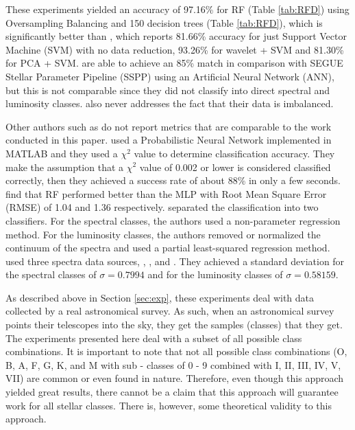 \documentclass[trackchanges, floatfix, twocolumn, tighten]{aastex62}
\begin{document}
These experiments yielded an accuracy of 97.16\% for RF (Table \ref{tab:RFD}) using Oversampling Balancing and 150 decision trees (Table \ref{tab:RFD}), which is significantly better than \cite{Xing}, which reports 81.66\% accuracy for just Support Vector Machine (SVM) with no data reduction, 93.26\% for wavelet + SVM and 81.30\% for PCA + SVM.  \cite{Schierscher} are able to achieve an 85\% match in comparison with SEGUE Stellar Parameter Pipeline (SSPP) using an Artificial Neural Network (ANN), but this is not comparable since they did not classify into direct spectral and luminosity classes. \cite{Schierscher} also never addresses the fact that their data is imbalanced.

Other authors such as \cite{Bazarghan, YI, Luo} do not report metrics that are comparable to the work conducted in this paper. \cite{Bazarghan} used a Probabilistic Neural Network implemented in MATLAB and they used a $\chi^2$ value to determine classification accuracy. They make the assumption that a $\chi^2$ value of 0.002 or lower is considered classified correctly, then they achieved a success rate of about 88\% in only a few seconds. \cite{YI} find that RF performed better than the MLP with Root Mean Square Error (RMSE) of 1.04 and 1.36 respectively. \cite{Luo} separated the classification into two classifiers. For the spectral classes, the authors used a non-parameter regression method. For the luminosity classes, the authors removed or normalized the continuum of the spectra and used a partial least-squared regression method. \cite{Luo} used three spectra data sources, \cite{Silva}, \cite{Pickles}, and \cite{Jacoby}. They achieved a standard deviation for the spectral classes of $\sigma = 0.7994$ and for the luminosity classes of $\sigma = 0.58159$.

As described above in Section \ref{sec:exp}, these experiments deal with data collected by a real astronomical survey. As such, when an astronomical survey points their telescopes into the sky, they get the samples (classes) that they get. The experiments presented here deal with a subset of all possible class combinations. It is important to note that not all possible class combinations (O, B, A, F, G, K, and M with sub - classes of 0 - 9 combined with I, II, III, IV, V, VII) are common or even found in nature. Therefore, even though this approach yielded great results, there cannot be a claim that this approach will guarantee work for all stellar classes. There is, however, some theoretical validity to this approach. 
\end{document}
